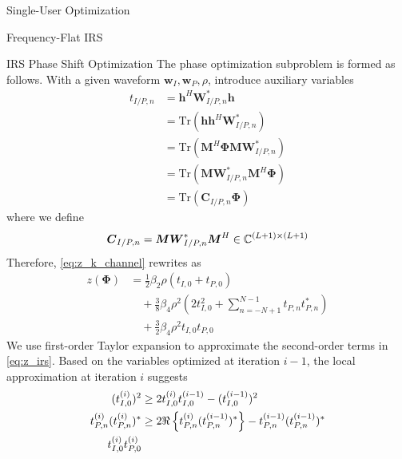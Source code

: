 \documentclass{IEEEtran}
\begin{document}
\begin{section}{Single-User Optimization}
\begin{subsection}{Frequency-Flat IRS}
		\begin{subsubsection}{IRS Phase Shift Optimization}\label{se:fs_irs}
			The phase optimization subproblem is formed as follows. With a given waveform $\boldsymbol{w}_I,\boldsymbol{w}_P,\rho$, introduce auxiliary variables
			\begin{equation}\label{eq:t}
				\begin{split}
					t_{I/P,n}
					&=\boldsymbol{h}^H\boldsymbol{W}_{I/P,n}^*\boldsymbol{h}\\
					&=\mathrm{Tr}(\boldsymbol{h}\boldsymbol{h}^H\boldsymbol{W}_{I/P,n}^*)\\
					&=\mathrm{Tr}(\boldsymbol{M}^H\boldsymbol{\Phi}\boldsymbol{M}\boldsymbol{W}_{I/P,n}^*)\\
					&=\mathrm{Tr}(\boldsymbol{M}\boldsymbol{W}_{I/P,n}^*\boldsymbol{M}^H\boldsymbol{\Phi})\\
					&=\mathrm{Tr}(\boldsymbol{C}_{I/P,n}\boldsymbol{\Phi})
				\end{split}
			\end{equation}
			where we define
			\begin{equation}\label{eq:C_{I/P,n}}
				\boldsymbol{C}_{I/P,n}=\boldsymbol{M}\boldsymbol{W}_{I/P,n}^*\boldsymbol{M}^H \in \mathbb{C}^{(L+1)\times(L+1)}
			\end{equation}
			Therefore, \ref{eq:z_k_channel} rewrites as
			\begin{equation}\label{eq:z_irs}
				\begin{split}
					z(\boldsymbol{\Phi})
					&=\frac{1}{2}{\beta_2}{\rho}(t_{I,0}+t_{P,0})\\
					&\quad+\frac{3}{8}{\beta_4}{\rho^2} \left(2t_{I,0}^2 + \sum_{n=-N+1}^{N-1}{t_{P,n}t_{P,n}^*}\right)\\
					&\quad+\frac{3}{2}{\beta_4}{\rho^2}t_{I,0}t_{P,0}
				\end{split}
			\end{equation}
			We use first-order Taylor expansion to approximate the second-order terms in \ref{eq:z_irs}. Based on the variables optimized at iteration $i - 1$, the local approximation at iteration $i$ suggests \cite{Adali2010}
			\begin{align}
				(t_{I,0}^{(i)})^2
				& \ge 2 t_{I,0}^{(i)}t_{I,0}^{(i-1)} - (t_{I,0}^{(i-1)})^2\label{eq:t_{I,0}_square}\\
				t_{P,n}^{(i)} (t_{P,n}^{(i)})^*
				& \ge 2 \Re\left\{t_{P,n}^{(i)} (t_{P,n}^{(i-1)})^*\right\} - t_{P,n}^{(i-1)} (t_{P,n}^{(i-1)})^*\\
				t_{I,0}^{(i)} t_{P,0}^{(i)}

\end{align}
\end{subsubsection}
\end{subsection}
\end{section}
\end{document}
